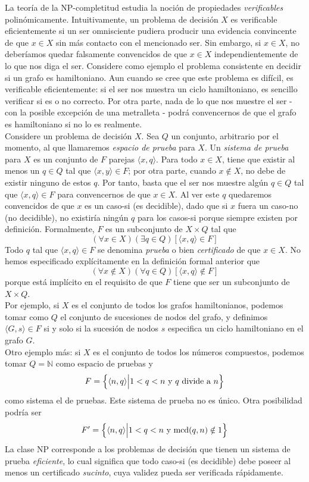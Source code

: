 La teoría de la NP-completitud estudia la noción de propiedades \emph{verificables} polinómicamente. Intuitivamente, un problema de decisión $X$ es verificable eficientemente si un ser omnisciente pudiera producir una evidencia convincente de que $x \in X$ sin más contacto con el mencionado ser. Sin embargo, si $x \in X$, no deberíamos quedar falsamente convencidos de que $x \in X$ independientemente de lo que nos diga el ser. Considere como ejemplo el problema consistente en decidir si un grafo es hamiltoniano. Aun cuando se cree que este problema es difícil, es verificable eficientemente: si el ser nos muestra un ciclo hamiltoniano, es sencillo verificar si es o no correcto. Por otra parte, nada de lo que nos muestre el ser - con la posible excepción de una metralleta - podrá convencernos de que el grafo es hamiltoniano si no lo es realmente.\\

Considere un problema de decisión $X$. Sea $Q$ un conjunto, arbitrario por el momento, al que llamaremos \emph{espacio de prueba} para $X$. Un \emph{sistema de prueba} para $X$ es un conjunto de $F$ parejas $\langle x, q \rangle$. Para todo $x \in X$, tiene que existir al menos un $q \in Q$ tal que $\langle x, y \rangle \in F$; por otra parte, cuando $x \notin X$, no debe de existir ninguno de estos $q$. Por tanto, basta que el ser nos muestre algún $q \in Q$ tal que $\langle x, q \rangle \in F$ para convencernos de que $x \in X$. Al ver este $q$ quedaremos convencidos de que $x$ es un caso-si (es decidible), dado que si $x$ fuera un caso-no (no decidible), no existiría ningún $q$ para los casos-si porque siempre existen por definición. Formalmente, $F$ es un subconjunto de $X \times Q$ tal que
\[ (\forall x \in X)(\exists q \in Q)[\langle x, q \rangle \in F] \]
Todo $q$ tal que $\langle x, q \rangle \in F$ se denomina \emph{prueba} o bien \emph{certificado} de que $x \in X$. No hemos especificado explícitamente en la definición formal anterior que
\[ (\forall x \notin X)(\forall q \in Q)[\langle x, q \rangle \notin F] \]
porque está implícito en el requisito de que $F$ tiene que ser un subconjunto de $X \times Q$.\\
Por ejemplo, si $X$ es el conjunto de todos los grafos hamiltonianos, podemos tomar como $Q$ el conjunto de sucesiones de nodos del grafo, y definimos $\langle G, s \rangle \in F$ si y solo si la sucesión de nodos $s$ especifica un ciclo hamiltoniano en el grafo $G$.\\
Otro ejemplo más: si $X$ es el conjunto de todos los números compuestos, podemos tomar $Q = \mathbb{N}$ como espacio de pruebas y
\[ F = \Bigl\{\langle n, q \rangle \Bigl| 1 < q < n\ \mbox{y}\ q\ \mbox{divide a}\ n \Bigl\} \]
como sistema el de pruebas. Este sistema de prueba no es único. Otra posibilidad podría ser
\[ F' = \Bigl\{\langle n, q \rangle \Bigl| 1 < q < n\ \mbox{y mcd}(q,n) \notin 1 \Bigl\} \]
La clase NP corresponde a los problemas de decisión que tienen un sistema de prueba \emph{eficiente}, lo cual significa que todo caso-si (es decidible) debe poseer al menos un certificado \emph{sucinto}, cuya validez pueda ser verificada rápidamente.\\

